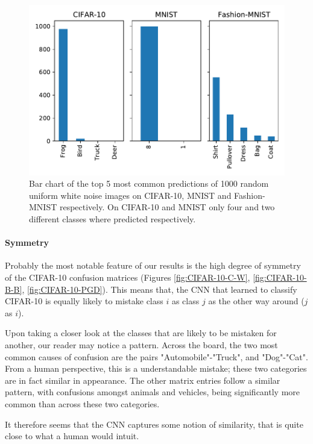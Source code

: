 \documentclass{article}
\begin{document}
\begin{figure}[t]
	\centering
	\includegraphics[width=\textwidth]{../code/results/barplot.pdf}
	\caption{Bar chart of the top 5 most common predictions of 1000 random uniform white noise images on CIFAR-10, MNIST and Fashion-MNIST respectively. On CIFAR-10 and MNIST only four and two different classes where predicted respectively.}
	\label{fig:barplot}
\end{figure}

\paragraph{Symmetry}
Probably the most notable feature of our results is the high degree of symmetry of the CIFAR-10 confusion matrices (Figures \ref{fig:CIFAR-10-C-W}, \ref{fig:CIFAR-10-B-B}, \ref{fig:CIFAR-10-PGD}). This means that, the CNN that learned to classify CIFAR-10 is equally likely to mistake class $i$ as class $j$ as the other way around ($j$ as $i$).

Upon taking a closer look at the classes that are likely to be mistaken for another, our reader may notice a pattern. Across the board, the two most common causes of confusion are the pairs "Automobile"-"Truck", and "Dog"-"Cat". From a human perspective, this is a understandable mistake; these two categories are in fact similar in appearance. The other matrix entries follow a similar pattern, with confusions amongst animals and vehicles, being significantly more common than across these two categories.

It therefore seems that the CNN captures some notion of similarity, that is quite close to what a human would intuit.
\vspace{12pt}
\end{document}
